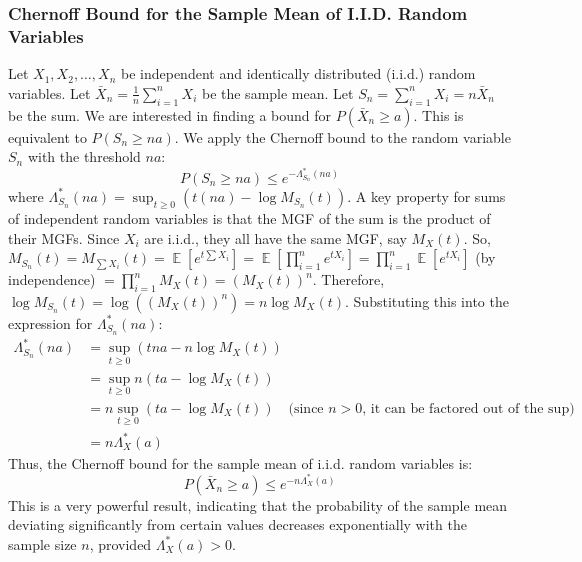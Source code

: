 \documentclass[11pt, letterpaper]{article}
\theoremstyle{plain} %
\theoremstyle{definition} %
\theoremstyle{remark} %
\DeclareMathOperator{\E}{\mathbb{E}}
\begin{document}
\subsubsection{Chernoff Bound for the Sample Mean of I.I.D. Random Variables}
Let $X_1, X_2, \dots, X_n$ be independent and identically distributed (i.i.d.) random variables.
Let $\bar{X}_n = \frac{1}{n}\sum_{i=1}^n X_i$ be the sample mean.
Let $S_n = \sum_{i=1}^n X_i = n\bar{X}_n$ be the sum.
We are interested in finding a bound for $P(\bar{X}_n \ge a)$. This is equivalent to $P(S_n \ge na)$.
We apply the Chernoff bound to the random variable $S_n$ with the threshold $na$:
\[ P(S_n \ge na) \le e^{-\Lambda_{S_n}^*(na)} \]
where $\Lambda_{S_n}^*(na) = \sup_{t \ge 0} (t(na) - \log M_{S_n}(t))$.
A key property for sums of independent random variables is that the MGF of the sum is the product of their MGFs. Since $X_i$ are i.i.d., they all have the same MGF, say $M_X(t)$.
So, $M_{S_n}(t) = M_{\sum X_i}(t) = \E[e^{t\sum X_i}] = \E[\prod_{i=1}^n e^{tX_i}] = \prod_{i=1}^n \E[e^{tX_i}]$ (by independence)
$= \prod_{i=1}^n M_X(t) = (M_X(t))^n$.
Therefore, $\log M_{S_n}(t) = \log((M_X(t))^n) = n \log M_X(t)$.
Substituting this into the expression for $\Lambda_{S_n}^*(na)$:
\begin{align*}
\Lambda_{S_n}^*(na) &= \sup_{t \ge 0} (tna - n \log M_X(t)) \\
&= \sup_{t \ge 0} n(ta - \log M_X(t)) \\
&= n \sup_{t \ge 0} (ta - \log M_X(t)) \quad \text{(since } n > 0 \text{, it can be factored out of the sup)} \\
&= n \Lambda_X^*(a)
\end{align*}
Thus, the Chernoff bound for the sample mean of i.i.d. random variables is:
\[ P(\bar{X}_n \ge a) \le e^{-n \Lambda_X^*(a)} \]
This is a very powerful result, indicating that the probability of the sample mean deviating significantly from certain values decreases exponentially with the sample size $n$, provided $\Lambda_X^*(a) > 0$.
\end{document}
